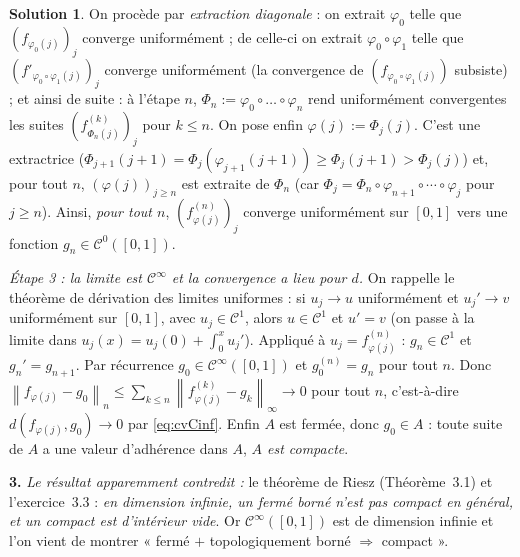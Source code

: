 \documentclass[11pt,a4paper]{article}
\newcommand{\norm}[1]{\left\|#1\right\|}
\newcommand{\Cz}{\mathcal{C}^0}
\newcommand{\Cinf}{\mathcal{C}^\infty}
\newcommand{\ie}{c'est-à-dire}
\theoremstyle{definition}
\newtheorem*{solution}{Solution}
\begin{document}
\begin{solution}
On procède par \emph{extraction diagonale} : on extrait $\varphi_0$ telle que $(f_{\varphi_0(j)})_j$ converge uniformément ; de celle-ci on extrait $\varphi_0\circ\varphi_1$ telle que $(f'_{\varphi_0\circ\varphi_1(j)})_j$ converge uniformément (la convergence de $(f_{\varphi_0\circ\varphi_1(j)})$ subsiste) ; et ainsi de suite : à l'étape $n$, $\Phi_n:=\varphi_0\circ\dots\circ\varphi_n$ rend uniformément convergentes les suites $(f^{(k)}_{\Phi_n(j)})_j$ pour $k\le n$. On pose enfin $\varphi(j):=\Phi_j(j)$. C'est une extractrice ($\Phi_{j+1}(j+1)=\Phi_j(\varphi_{j+1}(j+1))\ge\Phi_j(j+1)>\Phi_j(j)$) et, pour tout $n$, $(\varphi(j))_{j\ge n}$ est extraite de $\Phi_n$ (car $\Phi_j=\Phi_n\circ\varphi_{n+1}\circ\cdots\circ\varphi_j$ pour $j\ge n$). Ainsi, \emph{pour tout $n$}, $(f^{(n)}_{\varphi(j)})_j$ converge uniformément sur $[0,1]$ vers une fonction $g_n\in\Cz([0,1])$.

\emph{Étape 3 : la limite est $\Cinf$ et la convergence a lieu pour $d$.} On rappelle le théorème de dérivation des limites uniformes : si $u_j\to u$ uniformément et $u_j'\to v$ uniformément sur $[0,1]$, avec $u_j\in\mathcal C^1$, alors $u\in\mathcal C^1$ et $u'=v$ (on passe à la limite dans $u_j(x)=u_j(0)+\int_0^xu_j'$). Appliqué à $u_j=f^{(n)}_{\varphi(j)}$ : $g_n\in\mathcal C^1$ et $g_n'=g_{n+1}$. Par récurrence $g_0\in\Cinf([0,1])$ et $g_0^{(n)}=g_n$ pour tout $n$. Donc $\norm{f_{\varphi(j)}-g_0}_n\le\sum_{k\le n}\norm{f^{(k)}_{\varphi(j)}-g_k}_\infty\to0$ pour tout $n$, \ie{} $d(f_{\varphi(j)},g_0)\to0$ par \eqref{eq:cvCinf}. Enfin $A$ est fermée, donc $g_0\in A$ : toute suite de $A$ a une valeur d'adhérence dans $A$, \emph{$A$ est compacte}.

\medskip
\noindent\textbf{3.} \emph{Le résultat apparemment contredit :} le théorème de Riesz (Théorème~3.1) et l'exercice~3.3 : \emph{en dimension infinie, un fermé borné n'est pas compact en général, et un compact est d'intérieur vide}. Or $\Cinf([0,1])$ est de dimension infinie et l'on vient de montrer « fermé $+$ topologiquement borné $\Rightarrow$ compact ».


\end{solution}
\end{document}
